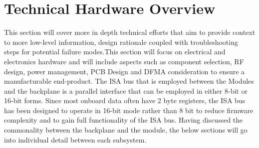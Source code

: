 \section{Technical Hardware Overview}
This section will cover more in depth technical efforts that aim to provide context to more low-level information, design rationale coupled with troubleshooting steps for potential failure modes.This section will focus on electrical and electronics hardware and will include aspects such as component selection, RF design, power management, PCB Design and DFMA consideration to ensure a manufacturable end-product. The ISA bus that is employed between the Modules and the backplane is a parallel interface that can be employed in either 8-bit or 16-bit forms. Since most onboard data often have 2 byte registers, the ISA bus has been designed to operate in 16-bit mode rather than 8 bit to reduce firmware complexity and to gain full functionality of the ISA bus. Having discussed the commonality between the backplane and the module, the below sections will go into individual detail between each subsystem. 
